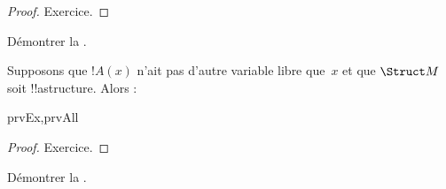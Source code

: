 \documentclass[../../../include/open-logic-section]{subfiles}
\begin{document}
\begin{proof}
Exercice.
\end{proof}

\begin{prob}
Démontrer la .
\end{prob}

\begin{prop}
  Supposons que $!A(x)$ n'ait pas d'autre variable libre que~$x$
  et que $\Struct M$ soit !!a{structure}. Alors :
  \begin{tagenumerate}{prvEx,prvAll}
\end{tagenumerate}
\end{prop}

\begin{proof}
Exercice.
\end{proof}

\begin{prob}
Démontrer la .
\end{prob}
\end{document}
